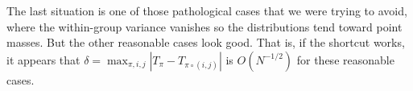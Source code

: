 \documentclass{amsart}
\begin{document}
The last situation is one of those pathological cases that we were
trying to avoid, where the within-group variance vanishes so the
distributions tend toward point masses.  But the other reasonable
cases look good.  That is, if the shortcut works, it appears that 
$\delta = \max_{\pi, i, j} |T_{\pi} - T_{\pi \circ (i, j)}|$ is
$O(N^{-1/2})$ for these reasonable cases.
\end{document}
